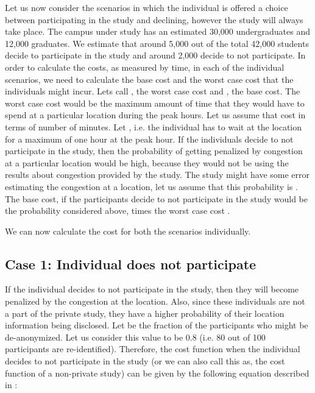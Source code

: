 \documentclass[conference]{IEEEtran}
\begin{document}
Let us now consider the scenarios in which the individual is offered a choice between participating in the study and declining, however the study will always take place. The campus under study has an estimated 30,000 undergraduates and 12,000 graduates. We estimate that around 5,000 out of the total 42,000 students decide to participate in the study and around 2,000 decide to not participate. In order to calculate the costs, as measured by time, in each of the individual scenarios, we need to calculate the base cost and the worst case cost that the individuals might incur. Lets call , the worst case cost and , the base cost. 
	The worst case cost  would be the maximum amount of time that they would have to spend at a particular location during the peak hours. Let us assume that cost  in terms of number of minutes. Let ,  i.e. the individual has to wait at the location for a maximum of one hour at the peak hour. If the individuals decide to not participate in the study, then the probability of getting penalized by congestion at a particular location would be high, because they would not be using the results about congestion provided by the study. The study might have some error estimating the congestion at a location, let us assume that this probability  is . 
	The base cost, if the participants decide to not participate in the study would be the probability considered above, times the worst case cost .



We can now calculate the cost for both the scenarios individually.

\subsection{Case 1: Individual does not participate}

If the individual decides to not participate in the study, then they will become penalized by the congestion at the location. Also, since these individuals are not a part of the private study, they have a higher probability of their location information being disclosed. Let  be the fraction of the participants who might be de-anonymized. Let us consider this value to be 0.8 (i.e. 80 out of 100 participants are re-identified). Therefore, the cost function when the individual decides to not participate in the study (or we can also call this as, the cost function of a non-private study) can be given by the following equation described in \cite{DBLP:conf/csfw/HsuGHKNPR14}:
\end{document}
